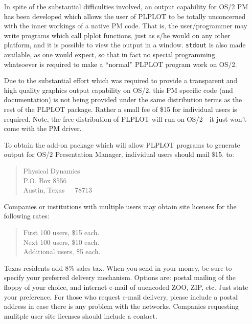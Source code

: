 In spite of the substantial difficulties involved, an output capability for
OS/2 PM has been developed which allows the user of PLPLOT to be totally
unconcerned with the inner workings of a native PM code.  That is, the 
user/programmer may write programs which call plplot functions, just as
s/he would on any other platform, and it is possible to view the output
in a window.  {\tt stdout} is also made available, as one would expect,
so that in fact no special programming whatsoever is required to make
a ``normal'' PLPLOT program work on OS/2.  

Due to the substantial effort which was required to provide a transparent
and high quality graphics output capability on OS/2, this PM specific
code (and documentation) is not being provided under the same distribution
terms as the rest of the PLPLOT package.  Rather a small fee of \$15 for
individual users is required.  Note, the free distribution of PLPLOT will 
run on OS/2---it just won't come with the PM driver.

To obtain the add-on package which will allow PLPLOT programs to generate
output for OS/2 Presentation Manager, individual users should mail \$15. to:
\begin{quote}
Physical Dynamics \\
P.O. Box 8556 \\
Austin, Texas~~~78713 \\
\end{quote}
Companies or institutions with multiple users may obtain site licenses for
the following rates:
\begin{quote}
First 100 users, \$15 each. \\
Next 100 users, \$10 each.  \\
Additional users, \$5 each. \\
\end{quote}
Texas residents add 8\% sales tax.  When you send in your money, be sure 
to specify your preferred delivery mechanism.  Options are: postal mailing
of the floppy of your choice, and internet e-mail of uuencoded ZOO, ZIP, 
etc.  Just
state your preference.  For those who request e-mail delivery, please include
a postal address in case there is any problem with the networks.
Companies requesting mulitple user site licenses should include a contact.

